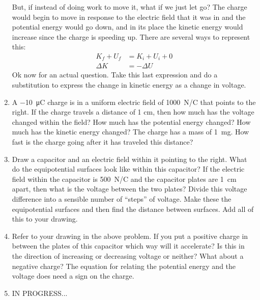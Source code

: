 \begin{enumerate}
But, if instead of doing work to move it, what if we just let go? The charge would begin to move in response to the electric field that it was in and the potential energy would go down, and in its place the kinetic energy would increase since the charge is speeding up. There are several ways to represent this:
\begin{align*}
	K_f + U_f &= K_i + U_i + 0\\
	\Delta K &= -\Delta U
\end{align*}
Ok now for an actual question. Take this last expression and do a substitution to express the change in kinetic energy as a change in voltage.

\item
A \SI{-10}{\micro\coulomb} charge is in a uniform electric field of \SI{1000}{\newton/\coulomb} that points to the right. If the charge travels a distance of 1 cm, then how much has the voltage changed within the field? How much has the potential energy changed? How much has the kinetic energy changed? The charge has a mass of \SI{1}{\milli\gram}. How fast is the charge going after it has traveled this distance?

\item
Draw a capacitor and an electric field within it pointing to the right. What do the equipotential surfaces look like within this capacitor? If the electric field within the capacitor is \SI{500}{N/C} and the capacitor plates are \SI{1}{cm} apart, then what is the voltage between the two plates? Divide this voltage difference into a sensible number of ``steps'' of voltage. Make these the equipotential surfaces and then find the distance between surfaces. Add all of this to your drawing.\hugeskip

\item
Refer to your drawing in the above problem. If you put a positive charge in between the plates of this capacitor which way will it accelerate? Is this in the direction of increasing or decreasing voltage or neither? What about a negative charge? The equation for relating the potential energy and the voltage does need a sign on the charge.


\item
IN PROGRESS...


\newpage 

\ %

\newpage

\end{enumerate}
